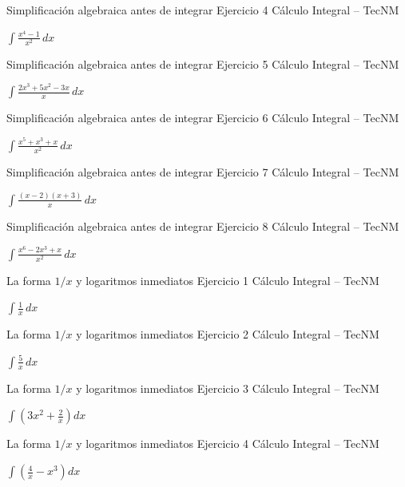 \documentclass[aspectratio=169,12pt]{beamer}
\newcommand{\ejercicio}[1]{%
  \begin{center}
  \vfill
  {\fontsize{24}{30}\selectfont #1}
  \vfill
  \end{center}
}
\begin{document}
\begin{frame}{Simplificación algebraica antes de integrar}
\small Ejercicio 4 \hfill Cálculo Integral -- TecNM
\ejercicio{$\displaystyle \int\frac{x^4-1}{x^2}\,dx$}
\end{frame}

\begin{frame}{Simplificación algebraica antes de integrar}
\small Ejercicio 5 \hfill Cálculo Integral -- TecNM
\ejercicio{$\displaystyle \int\frac{2x^3+5x^2-3x}{x}\,dx$}
\end{frame}

\begin{frame}{Simplificación algebraica antes de integrar}
\small Ejercicio 6 \hfill Cálculo Integral -- TecNM
\ejercicio{$\displaystyle \int\frac{x^5+x^3+x}{x^2}\,dx$}
\end{frame}

\begin{frame}{Simplificación algebraica antes de integrar}
\small Ejercicio 7 \hfill Cálculo Integral -- TecNM
\ejercicio{$\displaystyle \int\frac{(x-2)(x+3)}{x}\,dx$}
\end{frame}

\begin{frame}{Simplificación algebraica antes de integrar}
\small Ejercicio 8 \hfill Cálculo Integral -- TecNM
\ejercicio{$\displaystyle \int\frac{x^6-2x^3+x}{x^2}\,dx$}
\end{frame}

\begin{frame}{La forma $1/x$ y logaritmos inmediatos}
\small Ejercicio 1 \hfill Cálculo Integral -- TecNM
\ejercicio{$\displaystyle \int\frac{1}{x}\,dx$}
\end{frame}

\begin{frame}{La forma $1/x$ y logaritmos inmediatos}
\small Ejercicio 2 \hfill Cálculo Integral -- TecNM
\ejercicio{$\displaystyle \int\frac{5}{x}\,dx$}
\end{frame}

\begin{frame}{La forma $1/x$ y logaritmos inmediatos}
\small Ejercicio 3 \hfill Cálculo Integral -- TecNM
\ejercicio{$\displaystyle \int\left(3x^2+\frac{2}{x}\right)dx$}
\end{frame}

\begin{frame}{La forma $1/x$ y logaritmos inmediatos}
\small Ejercicio 4 \hfill Cálculo Integral -- TecNM
\ejercicio{$\displaystyle \int\left(\frac{4}{x}-x^3\right)dx$}
\end{frame}
\end{document}
